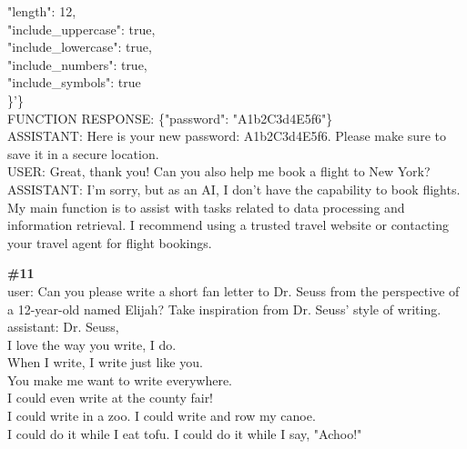 \documentclass[10pt]{article}
\begin{document}
\begin{Form}
\begin{tcolorbox}[colback=convbg,colframe=itemframe,boxrule=0.8pt,arc=2pt,breakable,left=6pt,right=6pt,top=5pt,bottom=5pt]
{"length": 12, \\[2pt]
"include\_uppercase": true, \\[2pt]
"include\_lowercase": true, \\[2pt]
"include\_numbers": true, \\[2pt]
"include\_symbols": true \\[2pt]
\}'\}   \\[2pt]
FUNCTION RESPONSE: \{"password": "A1b2C3d4E5f6"\} \\[2pt]
ASSISTANT: Here is your new password: A1b2C3d4E5f6. Please make sure to save it in a secure location.   \\[2pt]
USER: Great, thank you! Can you also help me book a flight to New York? \\[2pt]
ASSISTANT: I'm sorry, but as an AI, I don't have the capability to book flights. My main function is to assist with tasks related to data processing and information retrieval. I recommend using a trusted travel website or contacting your travel agent for flight bookings.  }
\end{tcolorbox}
\vspace{-1pt}
\CheckBox[name=q10c,width=1.6ex,height=1.6ex,bordercolor={0.45 0.45 0.45}]{~\textcolor{cbox}{COMPACT}}\quad
\CheckBox[name=q10d,width=1.6ex,height=1.6ex,bordercolor={0.45 0.45 0.45}]{~\textcolor{dbox}{DIFFUSE}}\quad
\CheckBox[name=q10n,width=1.6ex,height=1.6ex,bordercolor={0.45 0.45 0.45}]{~\textcolor{nbox}{NONE}}
\vspace{8pt}
\begin{tcolorbox}[colback=convbg,colframe=itemframe,boxrule=0.8pt,arc=2pt,breakable,left=6pt,right=6pt,top=5pt,bottom=5pt]
{\footnotesize\textbf{\#11}}\\[3pt]
{\footnotesize user: Can you please write a short fan letter to Dr. Seuss from the perspective of a 12-year-old named Elijah? Take inspiration from Dr. Seuss' style of writing. \\[2pt]
assistant: Dr. Seuss, \\[2pt]
I love the way you write, I do. \\[2pt]
When I write, I write just like you. \\[2pt]
You make me want to write everywhere. \\[2pt]
I could even write at the county fair! \\[2pt]
I could write in a zoo. I could write and row my canoe. \\[2pt]
I could do it while I eat tofu. I could do it while I say, "Achoo!" \\[2pt]
}
\end{tcolorbox}
\end{Form}
\end{document}
